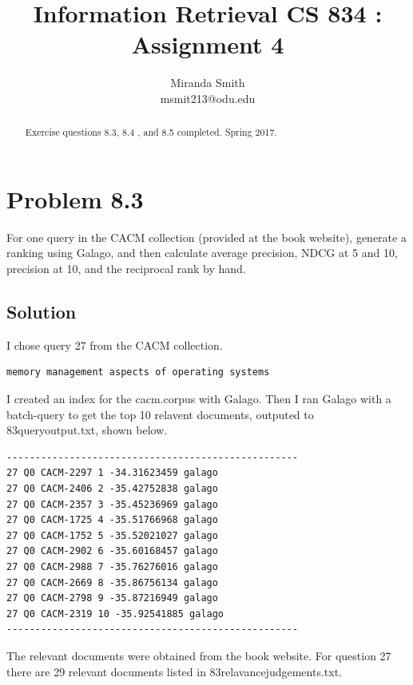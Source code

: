 \documentclass[letterpaper,12pt]{article}
\title{Information Retrieval CS 834 : Assignment 4}
\author{Miranda Smith\\ msmit213@odu.edu}
\begin{document}
\maketitle
\date{}

\begin{abstract}
Exercise questions 8.3, 8.4 , and 8.5 completed. Spring 2017. 
\end{abstract}

\pagebreak

\section{Problem 8.3}
For one query in the CACM collection (provided at the book website), generate a ranking using Galago, and then calculate average precision, NDCG at 5 and 10, precision at 10, and the reciprocal rank by hand.

\subsection{Solution}

I chose query 27 from the CACM collection. 

\begin{lstlisting}[breaklines]
memory management aspects of operating systems
\end{lstlisting}

I created an index for the cacm.corpus with Galago. Then I ran Galago with a batch-query to get the top 10 relavent documents, outputed to 83queryoutput.txt, shown below. 

\begin{lstlisting}[breaklines]
---------------------------------------------------
27 Q0 CACM-2297 1 -34.31623459 galago
27 Q0 CACM-2406 2 -35.42752838 galago
27 Q0 CACM-2357 3 -35.45236969 galago
27 Q0 CACM-1725 4 -35.51766968 galago
27 Q0 CACM-1752 5 -35.52021027 galago
27 Q0 CACM-2902 6 -35.60168457 galago
27 Q0 CACM-2988 7 -35.76276016 galago
27 Q0 CACM-2669 8 -35.86756134 galago
27 Q0 CACM-2798 9 -35.87216949 galago
27 Q0 CACM-2319 10 -35.92541885 galago
---------------------------------------------------
\end{lstlisting}

The relevant documents were obtained from the book website. For question 27 there are 29 relevant documents listed in 83relavancejudgements.txt.
\end{document}
